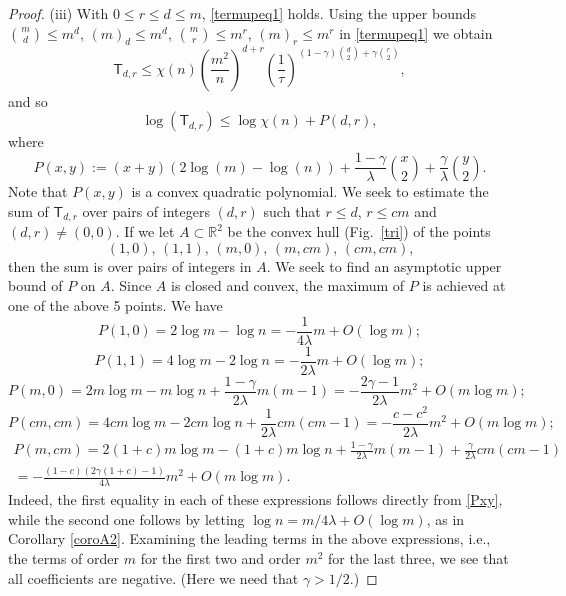 \documentclass[reqno]{amsart}
\theoremstyle{theorem}
\theoremstyle{definition}
\theoremstyle{remark}
\def\R{\mathbb{R}}
\newcommand{\1}{{\text{\Large $\mathfrak 1$}}}	%
\numberwithin{equation}{section}
\def\TTT{\mathsf T}
\begin{document}
\begin{proof}
(iii) 
With $0 \le r \le d \le m$, \eqref{termupeq1} holds.
Using the upper bounds $\binom{m}{d} \le m^d$, $(m)_d \le m^d$,
$\binom{m}{r} \le m^r$, $(m)_r \le m^r$ in \eqref{termupeq1} we obtain
\[
\TTT_{d, r} \le \chi(n) \left(\frac{m^2}{n}\right)^{d+r}
\left( \frac{1}{\tau} \right)^{(1 - \gamma) \binom{d}{2} + \gamma \binom{r}{2}},
\]
and so
\[
\log(\TTT_{d, r}) \le \log\chi(n) +  P(d,r),
\]
where
\begin{equation}
\label{Pxy}
P(x,y) := (x + y)(2 \log(m) - \log(n)) + 
\frac{1 - \gamma}{\lambda} \binom{x}{2} + \frac{\gamma}{\lambda} \binom{y}{2}.
\end{equation}
Note that $P(x,y)$ is a convex quadratic polynomial. We seek to estimate the 
sum of $\TTT_{d,r}$ over pairs of integers $(d,r)$ 
such that $r \le d$, $r \le cm$ and $(d,r) \neq (0,0)$.
If we let $A \subset \R^2$ be the convex hull (Fig.\ \ref{tri}) of the points
\[
\text{$(1, 0)$, $(1, 1)$, $(m, 0)$, $(m, cm)$, $(cm, cm)$,}
\]
then the sum is over pairs of integers in $A$. We seek to find 
an asymptotic upper bound of $P$ on $A$.
Since $A$ is closed and convex, the maximum of $P$ 
is achieved at one of the above 5 points.
We have
\[
P(1, 0) = 2 \log m - \log n = -\frac{1}{4 \lambda} m +O(\log m)  ;
\]
\[
P(1, 1) = 4 \log m - 2 \log n = -\frac{1}{2 \lambda} m +O(\log m)  ;
\]
\[
P(m, 0) = 2 m \log m - m \log n + \frac{1 - \gamma}{2\lambda} m(m-1)
= 
-\frac{2 \gamma - 1}{2 \lambda} m^2 +  O(m \log m)   ;
\]
\[
P(cm, cm) = 4 cm \log m - 2cm \log n + \frac{1}{2\lambda} cm(cm-1)
= -\frac{c - c^2}{2 \lambda} m^2 + O(m \log m)   ;
\]
\begin{multline*}
P(m, cm) = 2 (1 + c) m \log m - (1 + c) m \log n
+ \frac{1 - \gamma}{2\lambda} m(m-1)  + \frac{\gamma}{2\lambda} cm(cm-1)
\\
= -\frac{(1 - c) (2 \gamma (1 + c) - 1)}{4 \lambda} m^2 +  O(m \log m) .
\end{multline*}
Indeed, the first equality in each of these expressions follows 
directly from \eqref{Pxy}, while the second one follows by letting
$\log n = m/4\lambda + O(\log m)$, as in Corollary \ref{coroA2}.
Examining the leading terms in the above expressions, i.e., the terms
of order $m$ for the first two and order $m^2$ for the last three,
we see that all coefficients are negative. (Here we need that $\gamma>1/2$.)

\end{proof}
\end{document}
